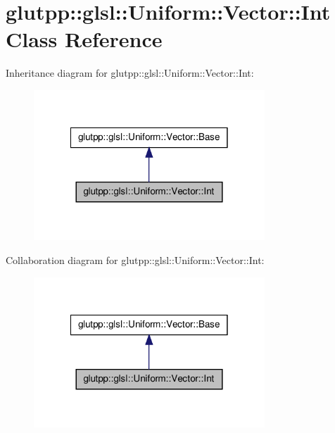 \hypertarget{classglutpp_1_1glsl_1_1Uniform_1_1Vector_1_1Int}{\section{glutpp\-:\-:glsl\-:\-:\-Uniform\-:\-:\-Vector\-:\-:\-Int \-Class \-Reference}
\label{classglutpp_1_1glsl_1_1Uniform_1_1Vector_1_1Int}
}


\-Inheritance diagram for glutpp\-:\-:glsl\-:\-:\-Uniform\-:\-:\-Vector\-:\-:\-Int\-:\nopagebreak
\begin{figure}[H]
\begin{center}
\leavevmode
\includegraphics[width=246pt]{classglutpp_1_1glsl_1_1Uniform_1_1Vector_1_1Int__inherit__graph}
\end{center}
\end{figure}


\-Collaboration diagram for glutpp\-:\-:glsl\-:\-:\-Uniform\-:\-:\-Vector\-:\-:\-Int\-:\nopagebreak
\begin{figure}[H]
\begin{center}
\leavevmode
\includegraphics[width=246pt]{classglutpp_1_1glsl_1_1Uniform_1_1Vector_1_1Int__coll__graph}
\end{center}
\end{figure}
